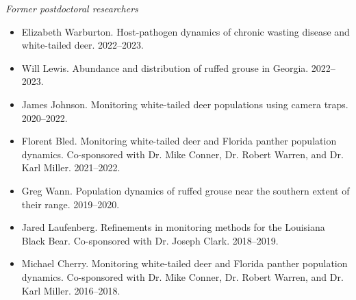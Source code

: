 \documentclass[12pt]{article}
\begin{document}


{\it Former postdoctoral researchers}
\begin{itemize}
   \item Elizabeth Warburton. Host-pathogen dynamics of chronic
     wasting disease and white-tailed deer. 2022--2023. 
   \item Will Lewis. Abundance and distribution of ruffed grouse in
     Georgia. 2022--2023.
   \item James Johnson. Monitoring white-tailed deer
     populations using camera traps. 2020--2022. 
   \item Florent Bled. Monitoring white-tailed deer and Florida panther
     population dynamics. Co-sponsored with Dr. Mike Conner,
     Dr. Robert Warren, and Dr. Karl Miller. 2021--2022. 
   \item Greg Wann. Population dynamics of ruffed grouse near the
     southern extent of their range. 2019--2020. 
   \item Jared Laufenberg. Refinements in
     monitoring methods for the Louisiana Black Bear. Co-sponsored
     with Dr. Joseph Clark.  2018--2019. 
   \item Michael Cherry. Monitoring white-tailed deer and Florida panther
     population dynamics. Co-sponsored with Dr. Mike Conner,
     Dr. Robert Warren, and Dr. Karl Miller. 2016--2018. 
\end{itemize}


\end{document}

